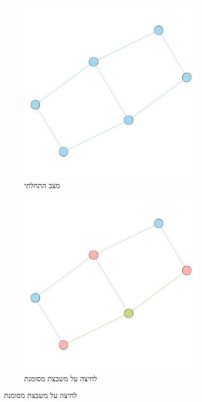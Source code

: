 \documentclass[12pt,leqno]{article}
\theoremstyle{theoremdd}
\begin{document}
\begin{figure}[H]
    \caption{משחק על גרף לדוגמה}
    \label{fig: start game in graph}
    \begin{subfigure}{.5\textwidth}
        \centering
        \caption{מצב התחלתי}
        \label{subfig: graph game start}
        \includegraphics[scale=0.7]{images/graph_start_board.png}
    \end{subfigure}%
    \begin{subfigure}{.5\textwidth}
        \centering
        \caption{לחיצה על משבצת מסומנת}
        \label{subfig: graph game move}
        \includegraphics[scale=0.7]{images/graph_press.png}
    \end{subfigure}%
\end{figure}
\end{document}
